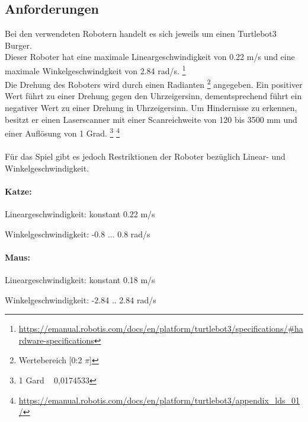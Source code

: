 \documentclass[
a4paper,     %
12pt         %
]{scrartcl}  %
\begin{document}
\subsection{Anforderungen}
Bei den verwendeten Robotern handelt es sich jeweils um einen Turtlebot3 Burger.\\ 
Dieser Roboter hat eine maximale Lineargeschwindigkeit von 0.22 m/s und eine maximale Winkelgeschwindgkeit von 2.84 rad/s. \footnote{\url{https://emanual.robotis.com/docs/en/platform/turtlebot3/specifications/\#hardware-specifications}}\\
Die Drehung des Roboters wird durch einen Radianten \footnote {Wertebereich [0:2 $\pi$]} angegeben. Ein positiver Wert führt zu einer Drehung gegen den Uhrzeigersinn, dementsprechend führt ein negativer Wert zu einer Drehung in Uhrzeigersinn.
Um Hindernisse zu erkennen, besitzt er einen Laserscanner mit einer Scanreichweite von 120 bis 3500 mm und einer Auflösung von 1 Grad. \footnote {1 Gard ~ 0,0174533} \footnote{\url{https://emanual.robotis.com/docs/en/platform/turtlebot3/appendix_lds_01/}} 
\\\\
Für das Spiel gibt es jedoch Restriktionen der Roboter bezüglich Linear- und Winkelgeschwindigkeit.\\
\paragraph{Katze:}
\begin{description}
 \item Lineargeschwindigkeit: konstant 0.22 m/s
 \item Winkelgeschwindigkeit: -0.8 ... 0.8 rad/s
\end{description}    
\paragraph{Maus:}
\begin{description}
 \item Lineargeschwindigkeit: konstant 0.18 m/s
 \item Winkelgeschwindigkeit: -2.84 .. 2.84 rad/s
\end{description}
\clearpage
\end{document}

